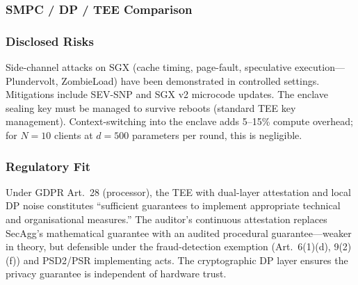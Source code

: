 \documentclass[10pt,journal]{IEEEtran}
\begin{document}
\subsubsection{SMPC / DP / TEE Comparison}

\begin{table}[t]
\centering
\caption{Comparison of privacy technologies for gradient confidentiality.}
\label{tab:priv-compare}
\footnotesize
{}
\end{table}

\subsubsection{Disclosed Risks}

Side-channel attacks on SGX (cache timing, page-fault, speculative execution---Plundervolt, ZombieLoad) have been demonstrated in controlled settings. Mitigations include SEV-SNP and SGX v2 microcode updates. The enclave sealing key must be managed to survive reboots (standard TEE key management). Context-switching into the enclave adds 5--15\% compute overhead; for $N=10$ clients at $d=500$ parameters per round, this is negligible.

\subsubsection{Regulatory Fit}

Under GDPR Art.~28 (processor), the TEE with dual-layer attestation and local DP noise constitutes ``sufficient guarantees to implement appropriate technical and organisational measures.'' The auditor's continuous attestation replaces SecAgg's mathematical guarantee with an audited procedural guarantee---weaker in theory, but defensible under the fraud-detection exemption (Art.~6(1)(d), 9(2)(f)) and PSD2/PSR implementing acts. The cryptographic DP layer ensures the privacy guarantee is independent of hardware trust.
\end{document}
